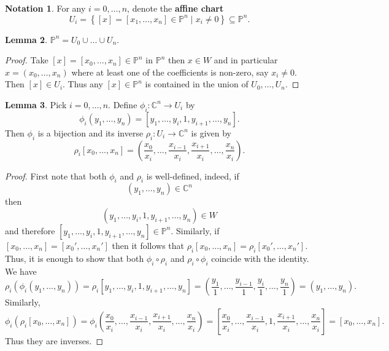 \documentclass{article}
\newcommand{\C}{\mathbb{C}}
\renewcommand{\P}{\mathbb{P}}
\newcommand{\rb}[1]{\left( #1 \right)}
\renewcommand{\sb}[1]{\left[ #1 \right]}
\newcommand{\cb}[1]{\left\{ #1 \right\}}
\theoremstyle{definition}\newtheorem{definition}{Definition}[section]
\theoremstyle{definition}\newtheorem{notation}[definition]{Notation}
\theoremstyle{definition}\newtheorem{remark}[definition]{Remark}
\theoremstyle{definition}\newtheorem{example}[definition]{Example}
\theoremstyle{definition}\newtheorem{fact}{Fact}
\theoremstyle{definition}\newtheorem{exercise}{Exercise}
\newtheorem{lemma}[definition]{Lemma}
\begin{document}
\begin{notation}
For any $ i = 0, \dots, n $, denote the \textbf{affine chart}
$$ U_i = \cb{\sb{x} = \sb{x_1, \dots, x_n} \in \P^n \mid x_i \ne 0} \subseteq \P^n. $$
\end{notation}

\begin{lemma}
$ \P^n = U_0 \cup \dots \cup U_n $.
\end{lemma}

\begin{proof}
Take $ \sb{x} = \sb{x_0, \dots, x_n} \in \P^n $ in $ \P^n $ then $ x \in W $ and in particular $ x = \rb{x_0, \dots, x_n} $ where at least one of the coefficients is non-zero, say $ x_i \ne 0 $. Then $ \sb{x} \in U_i $. Thus any $ \sb{x} \in \P^n $ is contained in the union of $ U_0, \dots, U_n $.
\end{proof}

\begin{lemma}
Pick $ i = 0, \dots, n $. Define $ \phi_i : \C^n \to U_i $ by
$$ \phi_i\rb{y_1, \dots, y_n} = \sb{y_1, \dots, y_i, 1, y_{i + 1}, \dots, y_n}. $$
Then $ \phi_i $ is a bijection and its inverse $ \rho_i : U_i \to \C^n $ is given by
$$ \rho_i\sb{x_0, \dots, x_n} = \rb{\dfrac{x_0}{x_i}, \dots, \dfrac{x_{i - 1}}{x_i}, \dfrac{x_{i + 1}}{x_i}, \dots, \dfrac{x_n}{x_i}}. $$
\end{lemma}

\begin{proof}
First note that both $ \phi_i $ and $ \rho_i $ is well-defined, indeed, if
$$ \rb{y_1, \dots, y_n} \in \C^n $$
then
$$ \rb{y_1, \dots, y_i, 1, y_{i + 1}, \dots, y_n} \in W $$
and therefore
$ \sb{y_1, \dots, y_i, 1, y_{i + 1}, \dots, y_n} \in \P^n $. Similarly, if $ \sb{x_0, \dots, x_n} = \sb{x_0', \dots, x_n'} $ then it follows that $ \rho_i\sb{x_0, \dots, x_n} = \rho_i\sb{x_0', \dots, x_n'} $. Thus, it is enough to show that both $ \phi_i \circ \rho_i $ and $ \rho_i \circ \phi_i $ coincide with the identity. We have
$$ \rho_i\rb{\phi_i\rb{y_1, \dots, y_n}} = \rho_i\sb{y_1, \dots, y_i, 1, y_{i + 1}, \dots, y_n} = \rb{\dfrac{y_1}{1}, \dots, \dfrac{y_{i - 1}}{1}, \dfrac{y_i}{1}, \dots, \dfrac{y_n}{1}} = \rb{y_1, \dots, y_n}. $$
Similarly,
$$ \phi_i\rb{\rho_i\sb{x_0, \dots, x_n}} = \phi_i\rb{\dfrac{x_0}{x_i}, \dots, \dfrac{x_{i - 1}}{x_i}, \dfrac{x_{i + 1}}{x_i}, \dots, \dfrac{x_n}{x_i}} = \sb{\dfrac{x_0}{x_i}, \dots, \dfrac{x_{i - 1}}{x_i}, 1, \dfrac{x_{i + 1}}{x_i}, \dots, \dfrac{x_n}{x_i}} = \sb{x_0, \dots, x_n}. $$
Thus they are inverses.
\end{proof}
\end{document}
